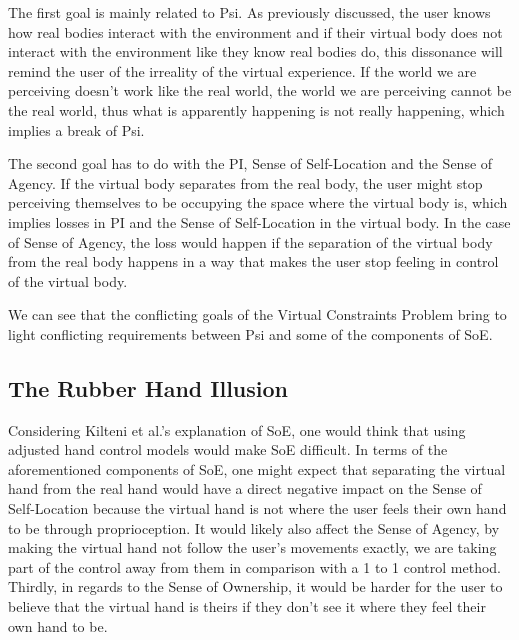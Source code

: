 The first goal is mainly related to Psi. As previously discussed, the user knows how real bodies interact with the environment and if their virtual body does not interact with the environment like they know real bodies do, this dissonance will remind the user of the irreality of the virtual experience. If the world we are perceiving doesn't work like the real world, the world we are perceiving cannot be the real world, thus what is apparently happening is not really happening, which implies a break of Psi.

The second goal has to do with the PI, Sense of Self-Location and the Sense of Agency. If the virtual body separates from the real body, the user might stop perceiving themselves to be occupying the space where the virtual body is, which implies losses in PI and the Sense of Self-Location in the virtual body. In the case of Sense of Agency, the loss would happen if the separation of the virtual body from the real body happens in a way that makes the user stop feeling in control of the virtual body.

We can see that the conflicting goals of the Virtual Constraints Problem bring to light conflicting requirements between Psi and some of the components of SoE.


\subsection{The Rubber Hand Illusion}
\label{subsec:rubberHandIllusion}

Considering Kilteni et al.'s explanation of SoE, one would think that using adjusted hand control models would make SoE difficult. In terms of the aforementioned components of SoE, one might expect that separating the virtual hand from the real hand would have a direct negative impact on the Sense of Self-Location because the virtual hand is not where the user feels their own hand to be through proprioception. It would likely also affect the Sense of Agency, by making the virtual hand not follow the user's movements exactly, we are taking part of the control away from them in comparison with a 1 to 1 control method. Thirdly, in regards to the Sense of Ownership, it would be harder for the user to believe that the virtual hand is theirs if they don't see it where they feel their own hand to be.

